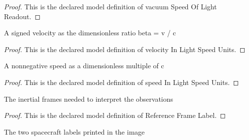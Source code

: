 \begin{proof}
  This is the declared model definition of vacuum Speed Of Light Readout.
\end{proof}
\begin{definition}
  \label{def:physics:phyx-mini-0547:phyxminiproblems-problemphyxmini0547-velocityinlightspeedunits}
  A signed velocity as the dimensionless ratio beta = v / c
\end{definition}
\begin{proof}
  This is the declared model definition of velocity In Light Speed Units.
\end{proof}
\begin{definition}
  \label{def:physics:phyx-mini-0547:phyxminiproblems-problemphyxmini0547-speedinlightspeedunits}
  A nonnegative speed as a dimensionless multiple of c
\end{definition}
\begin{proof}
  This is the declared model definition of speed In Light Speed Units.
\end{proof}
\begin{definition}
  \label{def:physics:phyx-mini-0547:phyxminiproblems-problemphyxmini0547-referenceframelabel}
  The inertial frames needed to interpret the observations
\end{definition}
\begin{proof}
  This is the declared model definition of Reference Frame Label.
\end{proof}
\begin{definition}
  \label{def:physics:phyx-mini-0547:phyxminiproblems-problemphyxmini0547-spacecraftlabel}
  The two spacecraft labels printed in the image
\end{definition}
